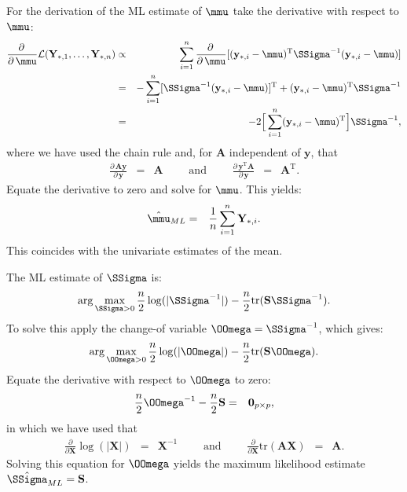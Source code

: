 \documentclass[a4paper]{article}
\theoremstyle{myexamplestyle}
\begin{document}
For the derivation of the ML estimate of $\mmu$ take the derivative with respect to $\mmu$:
\begin{eqnarray*}
\frac{\partial \,}{\partial \, \mmu}  \mathcal{L}(\mathbf{Y}_{\ast, 1}, \ldots, \mathbf{Y}_{\ast, n} )
& \propto &   \sum_{i=1}^n \frac{\partial \,}{\partial \, \mmu}  [(\mathbf{y}_{\ast,i} - \mmu)^{\mathrm{T}} \SSigma^{-1} (\mathbf{y}_{\ast,i} - \mmu)]
\\
& = &  - \sum_{i=1}^n [ \SSigma^{-1} (\mathbf{y}_{\ast,i} - \mmu)]^{\mathrm{T}}
+ (\mathbf{y}_{\ast,i} - \mmu)^{\mathrm{T}} \SSigma^{-1}
\\
& = &  - 2 \Big[ \sum_{i=1}^n (\mathbf{y}_{\ast,i} - \mmu)^{\mathrm{T}}
\Big] \SSigma^{-1},
\end{eqnarray*}
where we have used the chain rule and, for $\mathbf{A}$ independent of $\mathbf{y}$, that
\begin{eqnarray*}
\frac{\partial \,  \mathbf{A} \mathbf{y}}{ \partial \, \mathbf{y}} & = &  \mathbf{A}
\qquad \mbox{ and } \qquad
\frac{\partial \, \mathbf{y}^{\mathrm{T}} \mathbf{A}}{ \partial \, \mathbf{y}} \, \,\, = \, \, \,  \mathbf{A}^{\mathrm{T}}.
\end{eqnarray*}
Equate the derivative to zero and solve for $\mmu$. This yields:
\begin{eqnarray*}
\hat{\mmu}_{ML} & = & \frac{1}{n} \sum_{i=1}^n \mathbf{Y}_{\ast, i}.
\end{eqnarray*}
This coincides with the univariate estimates of the mean.

The ML estimate of $\SSigma$ is:
\begin{eqnarray*}
\mbox{arg} \max_{\SSigma > 0} \frac{n}{2} \log ( | \SSigma^{-1} | ) - \frac{n}{2}  \mbox{tr}( \mathbf{S} \SSigma^{-1} ).
\end{eqnarray*}
To solve this apply the change-of variable $\OOmega = \SSigma^{-1}$, which gives:
\begin{eqnarray*}
\mbox{arg} \max_{\OOmega > 0} \frac{n}{2} \log ( | \OOmega | ) - \frac{n}{2}  \mbox{tr}( \mathbf{S} \OOmega ).
\end{eqnarray*}
Equate the derivative with respect to $\OOmega$ to zero:
\begin{eqnarray*}
\frac{n}{2} \OOmega^{-1} - \frac{n}{2}  \mathbf{S}  & = & \mathbf{0}_{p \times p},
\end{eqnarray*}
in which we have used that 
\begin{eqnarray*}
\frac{\partial }{\partial \mathbf{X}} \log ( | \mathbf{X} | ) & = & \mathbf{X}^{-1} \qquad \mbox{ and } \qquad 
\frac{\partial }{\partial \mathbf{X}} \mbox{tr} ( \mathbf{A} \mathbf{X}  ) \, \, \, = \, \, \, \mathbf{A}.
\end{eqnarray*}
Solving this equation for $\OOmega$ yields the maximum likelihood estimate $\hat{\SSigma}_{ML} =  \mathbf{S}$.
\end{document}
